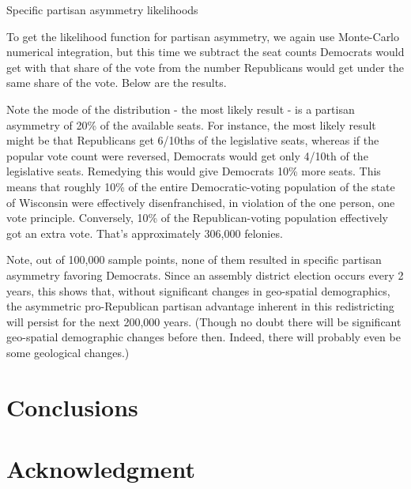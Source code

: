\documentclass[preprint,12pt]{article}
\begin{document}
 

Specific partisan asymmetry likelihoods
 
To get the likelihood function for partisan asymmetry, we again use Monte-Carlo numerical integration, but this time we subtract the seat counts Democrats would get with that share of the vote from the number Republicans would get under the same share of the vote.  Below are the results.
 

 
Note the mode of the distribution - the most likely result - is a partisan asymmetry of 20\% of the available seats.  For instance, the most likely result might be that Republicans get 6/10ths of the legislative seats, whereas if the popular vote count were reversed, Democrats would get only 4/10th of the legislative seats.  Remedying this would give Democrats 10\% more seats.  This means that roughly 10\% of the entire Democratic-voting population of the state of Wisconsin were effectively disenfranchised, in violation of the one person, one vote principle.  Conversely, 10\% of the Republican-voting population effectively got an extra vote.  That's approximately 306,000 felonies.
 
Note, out of 100,000 sample points, none of them resulted in specific partisan asymmetry favoring Democrats.  Since an assembly district election occurs every 2 years, this shows that, without significant changes in geo-spatial demographics, the asymmetric pro-Republican partisan advantage inherent in this redistricting will persist for the next 200,000 years.  (Though no doubt there will be significant geo-spatial demographic changes before then.  Indeed, there will probably even be some geological changes.)



\section{Conclusions}

\clearpage
\section*{Acknowledgment}
\section*{}
%
%
\clearpage
\end{document}
